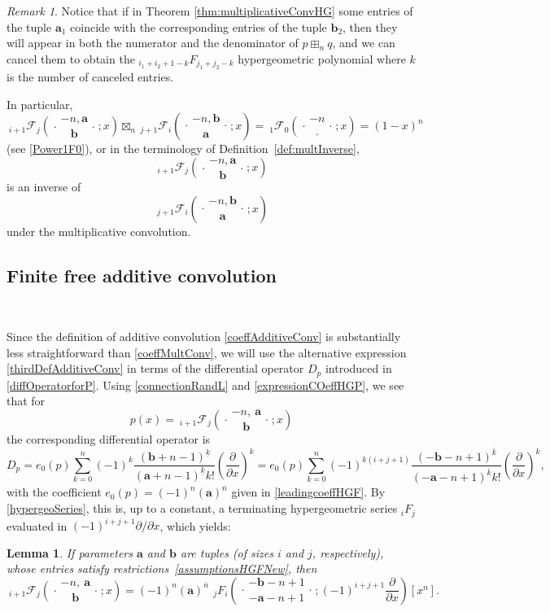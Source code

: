 \documentclass[reqno,11pt]{amsart}
\newtheorem{lemma}[theorem]{Lemma}
\theoremstyle{remark}
\newtheorem{remark}[theorem]{Remark}
\newcommand{\raising}[2]{\left(#1\right)^{\overline{#2}}}
\newcommand{\falling}[2]{\left(#1\right)^{\underline{#2}}}
\newcommand*\pFq[5]{%
 {\ }_{#1}{\mathcal F}_{#2}{\left(\genfrac..{0pt}{}{#3}{#4};#5\right)}%
}
\newcommand*\HGF[5]{%
 {\ }_{#1} F_{#2}{\left(\genfrac..{0pt}{}{#3}{#4};#5\right)}%
}
\begin{document}
\begin{remark} \label{rem:Multinverses}
Notice that if in Theorem \ref{thm:multiplicativeConvHG}  some entries of the tuple $\bm a_1$ coincide with the corresponding entries of the tuple $\bm b_2$, then they will appear in both the numerator and the denominator of $p\boxplus_n q$, and we can cancel them to obtain the ${}_{i_1+i_2+1-k}F_{j_1+j_2-k}$ hypergeometric polynomial where $k$ is the number of canceled entries. 

In particular, 
$$
\pFq{i+1}{j}{-n, \bm a}{\bm b}{x} \boxtimes_n \pFq{j+1}{i}{-n, \bm b}{\bm a}{x} = \pFq{1}{0}{-n }{\cdot }{x} = (1-x)^n
$$
(see \eqref{Power1F0}), or in the terminology of Definition~\ref{def:multInverse}, 
$$
\pFq{i+1}{j}{-n, \bm a}{\bm b}{x}  
$$
is an inverse of 
$$
    \pFq{j+1}{i}{-n, \bm b}{\bm a}{x} 
$$
under the multiplicative convolution.
\end{remark}



\subsection{Finite free  additive convolution} \label{sec:additive}\ 

Since the definition of additive convolution \eqref{coeffAdditiveConv}  is substantially less straightforward than \eqref{coeffMultConv}, we will use the alternative expression \eqref{thirdDefAdditiveConv} in terms of the differential operator $D_p$ introduced in \eqref{diffOperatorforP}. Using \eqref{connectionRandL} and \eqref{expressionCOeffHGP}, we see that for
$$
p(x)=\pFq{i+1}{j}{-n,\ \bm{a}}{\bm b}{x} 
$$
the corresponding differential operator is  
$$
D_p= e_0(p) \sum_{k=0}^n (-1)^k \frac{\falling{\bm b+n-1}{k} }{\falling{\bm a+n-1}{k}k!} \left(\frac{\partial}{\partial x}\right)^k = e_0(p) \sum_{k=0}^n (-1)^{k(i+j+1)} \frac{\raising{-\bm b-n+1}{k} }{\raising{-\bm a-n+1}{k}k!} \left(\frac{\partial}{\partial x}\right)^k,
$$
with the coefficient $e_0(p) = (-1)^n \raising{\bm a}{n} $ given in \eqref{leadingcoeffHGF}. 
By \eqref{hypergeoSeries}, this is, up to a constant, a terminating hypergeometric series $_i F_j$ evaluated in $(-1)^{i+j+1} \partial / \partial x$, which yields: 
\begin{lemma}
    \label{lemma:DiffOperator}
 If parameters $\bm a$ and $ \bm b  $ are tuples (of sizes $i$ and $j$, respectively), whose entries satisfy restrictions~\eqref{assumptionsHGFNew}, then
    \begin{equation}
    \label{D_p}
    \pFq{i+1}{j}{-n,\ \bm a}{\bm b}{x}= (-1)^n \raising{\bm a}{n}  \, \HGF{j}{i}{-\bm b-n+1}{-\bm a-n+1}{(-1)^{i+j+1}\frac{\partial}{\partial x}} [x^n].
\end{equation}
\end{lemma}
\end{document}
